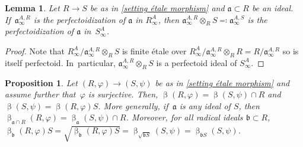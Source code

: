 \documentclass[JEP,XML,SOM,Unicode,published]{cedram}
\let\autoref\cref
\theoremstyle{plain}
\newtheorem{proposition}[theorem]{Proposition}
\newtheorem{lemma}[theorem]{Lemma}
\theoremstyle{definition}
\numberwithin{equation}{theorem}
\let\tensor\otimes
\newcommand{\fra}{\mathfrak{a}}
\newcommand{\frab}{\mathfrak{b}}
\renewcommand{\phi}{\varphi}
\newcommand{\rphi}{(R,\phi)}
\newcommand{\spsi}{(S,\psi)}
\newcommand{\rafty}{R^A_\infty}
\newcommand{\safty}{S^A_\infty}
\begin{document}
\begin{lemma}\label{lemma extension of perfectoid ideal étale case}
Let $R\to S$ be as in \autoref{setting étale morphism} and $\fra\subset R$ be an ideal. If~$\fra^{A,R}_\infty$ is the perfectoidization of $\fra$ in $\rafty$, then $\fra^{A,R}_\infty\tensor_R S\eqqcolon\fra^{A,S}_\infty$ is the perfectoidization of $\fra$ in~$\safty$.
\end{lemma}

\begin{proof}
Note that $\rafty/\fra^{A,R}_\infty\tensor_R S$ is finite étale over $\rafty/\fra^{A,R}_\infty\tensor_R R= R/\fra^{A,R}_\infty$ so is itself perfectoid. In~particular, $\fra^{A,R}_\infty\tensor_R S$ is a perfectoid ideal of $\safty$.
\end{proof}

\begin{proposition}\label{behavior beta étale morphism}
Let $\rphi\to\spsi$ be as in \autoref{setting étale morphism} and assume further that~$\phi$ is surjective. Then, $\upbeta\rphi=\upbeta\spsi\cap R$ and $\upbeta\spsi=\upbeta\rphi S$. More generally, if~$\fra$ is any ideal of $S$, then $\upbeta_{\fra\cap R} \rphi=\upbeta_\fra \spsi \cap R$.
Moreover, for all radical ideals $\frab\subset R$, $\upbeta_\frab\rphi S=\sqrt{\upbeta_\frab\rphi S}=\upbeta_{\sqrt{\frab S}}\spsi=\upbeta_{\frab S}\spsi$.
\end{proposition}
\end{document}
